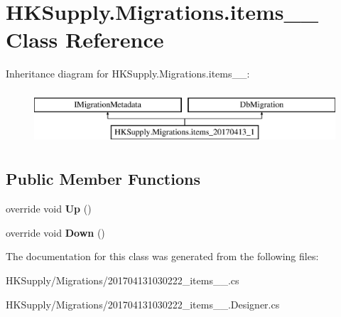 \hypertarget{class_h_k_supply_1_1_migrations_1_1items__20170413__1}{}\section{H\+K\+Supply.\+Migrations.\+items\+\_\+\_ Class Reference}
\label{class_h_k_supply_1_1_migrations_1_1items__20170413__1}
Inheritance diagram for H\+K\+Supply.\+Migrations.\+items\+\_\+\_\+:\begin{figure}[H]
\begin{center}
\leavevmode
\includegraphics[height=2.000000cm]{class_h_k_supply_1_1_migrations_1_1items__20170413__1}
\end{center}
\end{figure}
\subsection*{Public Member Functions}
\begin{DoxyCompactItemize}
\item 
\mbox{\label{class_h_k_supply_1_1_migrations_1_1items__20170413__1_a70de3064a1a97e748c32e566ac2e3c1d}} 
override void {\bfseries Up} ()
\item 
\mbox{\label{class_h_k_supply_1_1_migrations_1_1items__20170413__1_a8b777db6a4f1c8b1032c1216d859336b}} 
override void {\bfseries Down} ()
\end{DoxyCompactItemize}


The documentation for this class was generated from the following files\+:\begin{DoxyCompactItemize}
\item 
H\+K\+Supply/\+Migrations/201704131030222\+\_\+items\+\_\+\_.\+cs\item 
H\+K\+Supply/\+Migrations/201704131030222\+\_\+items\+\_\+\_.\+Designer.\+cs\end{DoxyCompactItemize}
